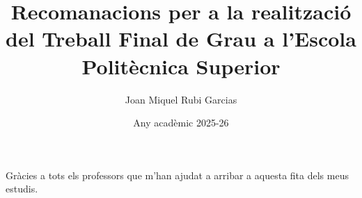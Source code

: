\documentclass[spanish,GMAT]{TFGEPSUIB}
\title{Recomanacions per a la realització del Treball Final de Grau a l'Escola Politècnica Superior}
\author{Joan Miquel Rubi Garcias}
\date{Any acadèmic 2025-26}
\begin{document}
\portada
\portadainterior
\frontmatter

%
\cleartorecto \thispagestyle{empty}
\begin{agraiments}
Gràcies a tots els professors que m'han ajudat a arribar a aquesta fita dels meus estudis.
\end{agraiments}

\cleartorecto \tableofcontents


 

 

\mainmatter\pagestyle{ruled}





%





\appendix 
 



\backmatter



 
\end{document}
